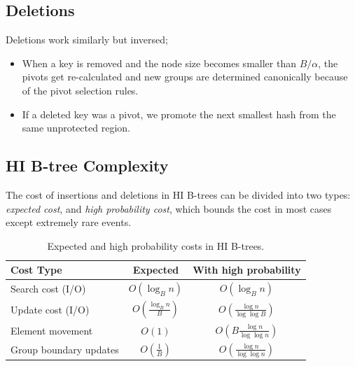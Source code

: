 \documentclass{article}
\begin{document}
\subsection{Deletions}

Deletions work similarly but inversed;
\begin{itemize}
    \item When a key is removed and the node size becomes smaller than $B/\alpha$, the pivots get re-calculated and new groups are determined canonically because of the pivot selection rules.
    \item If a deleted key was a pivot, we promote the next smallest hash from the same unprotected region.
\end{itemize}

\subsection{HI B-tree Complexity}

The cost of insertions and deletions in HI B-trees can be divided into two types: 
\emph{expected cost}, and \emph{high probability cost}, which bounds the cost in most cases except extremely rare events.

\begin{table}[h]
    \centering
    \begin{tabular}{lcc}
	\hline
        \textbf{Cost Type}     & \textbf{Expected}                  & \textbf{With high probability}               \\ \hline
	Search cost (I/O)      & $O(\log_B n)$                      & $O(\log_B n)$                                \\
	Update cost (I/O)      & $O\left(\frac{\log_B n}{B}\right)$ & $O\left(\frac{\log n}{\log \log B}\right)$   \\
	Element movement       & $O(1)$                             & $O\left(B \frac{\log n}{\log \log n}\right)$ \\
	Group boundary updates & $O\left(\frac{1}{B}\right)$        & $O\left(\frac{\log n}{\log \log n}\right)$   \\ \hline
    \end{tabular}
    \caption{Expected and high probability costs in HI B-trees.}
\end{table}

\printbibliography
\end{document}
